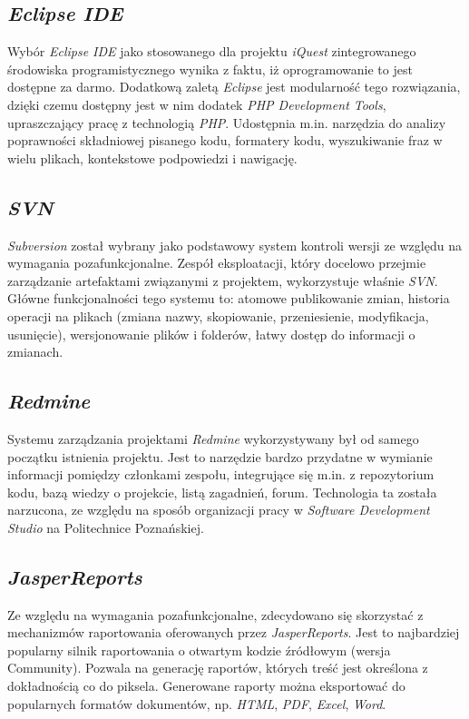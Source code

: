 \subsection{\textit{Eclipse IDE}}
\label{Chapter636}

Wybór \textit{Eclipse IDE} jako stosowanego dla projektu \textit{iQuest} zintegrowanego środowiska programistycznego wynika z faktu, iż oprogramowanie to jest dostępne za darmo. Dodatkową zaletą \textit{Eclipse} jest modularność tego rozwiązania, dzięki czemu dostępny jest w nim dodatek \textit{PHP Development Tools}, upraszczający pracę z technologią \textit{PHP}. Udostępnia m.in. narzędzia do analizy poprawności składniowej pisanego kodu, formatery kodu, wyszukiwanie fraz w wielu plikach, kontekstowe podpowiedzi i nawigację.

\subsection{\textit{SVN}}
\label{Chapter637}

\textit{Subversion} został wybrany jako podstawowy system kontroli wersji ze względu na wymagania pozafunkcjonalne. Zespół eksploatacji, który docelowo przejmie zarządzanie artefaktami związanymi z projektem, wykorzystuje właśnie \textit{SVN}. Główne funkcjonalności tego systemu to: atomowe publikowanie zmian, historia operacji na plikach (zmiana nazwy, skopiowanie, przeniesienie, modyfikacja, usunięcie), wersjonowanie plików i folderów, łatwy dostęp do informacji o zmianach.

\subsection{\textit{Redmine}}
\label{Chapter638}

Systemu zarządzania projektami \textit{Redmine} wykorzystywany był od samego początku istnienia projektu. Jest to narzędzie bardzo przydatne w wymianie informacji pomiędzy członkami zespołu, integrujące się m.in. z repozytorium kodu, bazą wiedzy o projekcie, listą zagadnień, forum.  Technologia ta została narzucona, ze względu na sposób organizacji pracy w \textit{Software Development Studio} na Politechnice Poznańskiej.

\subsection{\textit{JasperReports}}
\label{Chapter639}

Ze względu na wymagania pozafunkcjonalne, zdecydowano się skorzystać z mechanizmów raportowania oferowanych przez \textit{JasperReports}. Jest to najbardziej popularny silnik raportowania o otwartym kodzie źródłowym (wersja Community). Pozwala na generację raportów, których treść jest określona z dokładnością co do piksela. Generowane raporty można eksportować do popularnych formatów dokumentów, np. \textit{HTML}, \textit{PDF}, \textit{Excel}, \textit{Word}.

